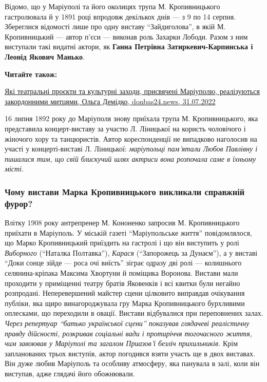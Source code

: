 Відомо, що у Маріуполі та його околицях трупа М. Кропивницького гастролювала й
у 1891 році впродовж декількох днів — з 9 по 14 серпня. Збереглися відомості
лише про одну виставу \enquote{Зайдиголова}, в якій М. Кропивницький — автор п'єси —
виконав роль Захарки Лободи. Разом з ним виступали такі видатні актори, як
\textbf{Ганна Петрівна Затиркевич-Карпинська і Леонід Якович Манько}.

\textbf{Читайте також:} 

\href{https://donbas24.news/news/yaki-teatralni-projekti-ta-kulturni-zaxodi-prisvyaceni-mariupolyu-realizuyutsya-zakordonnimi-mitcyami}{%
Які театральні проєкти та культурні заходи, присвячені Маріуполю, реалізуються закордонними митцями, Ольга Демідко, donbas24.news, 31.07.2022}


16 липня 1892 року до Маріуполя знову приїхала трупа М. Кропивницького, яка
представила концерт-виставу за участю Л. Ліницької на користь чоловічого і
жіночого хору та танцюристів. Автор кореспонденції не випадково наголосив на
участі у концерті-виставі Л. Ліницької: \emph{маріупольці пам'ятали Любов Павлівну і
пишалися тим, що свій блискучий шлях актриси вона розпочала саме в їхньому
місті.}


\subsubsection{Чому вистави Марка Кропивницького викликали справжній фурор?}

Влітку 1908 року антрепренер М. Кононенко запросив М. Кропивницького приїхати в
Маріуполь. У міській газеті \enquote{Маріупольське життя} повідомлялося, що Марко
Кропивницький приїздить на гастролі і що він виступить у ролі \emph{Виборного}
(\enquote{Наталка Полтавка}), \emph{Карася} (\enquote{Запорожець за Дунаєм}), а у виставі \enquote{Доки сонце
зійде — роса очі виїсть} зіграє одразу дві ролі — колишнього селянина-кріпака
Максима Хвортуни й поміщика Воронова. Вистави мали проходити у приміщенні
театру братів Яковенків і всі квитки були негайно розпродані. Неперевершений
майстер сцени цілковито виправдав очікування публіки, яка щиро винагороджувала
гру Марка Кропивницького бурхливими оплесками, що переходили в овації. Вистави
відбувалися при переповнених залах. \emph{Через репертуар \enquote{батько української сцени}
показував глядачеві реалістичну правду дійсності, розкривав соціальні вади і
протиріччя тогочасного життя, чим завоював у Маріуполі та загалом Приазов'ї
безліч прихильників.} Крім запланованих трьох виступів, актор погодився взяти
участь ще в двох виставах. Він дуже любив Маріуполь та особливу атмосферу, яка
панувала в залі, коли він виступав, адже глядачі його обожнювали.

